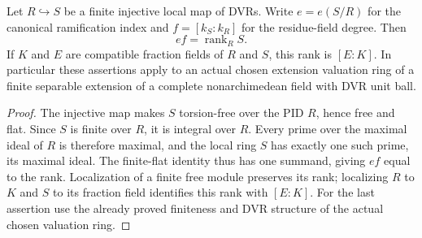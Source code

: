 \begin{lemma}
\label{fw:local-dvr-degree-identity}
\leanok
Let $R\hookrightarrow S$ be a finite injective local map of DVRs.
Write $e=e(S/R)$ for the canonical ramification index and
$f=[k_S:k_R]$ for the residue-field degree. Then
\[
 ef=\operatorname{rank}_R S.
\]
If $K$ and $E$ are compatible fraction fields of $R$ and $S$, this
rank is $[E:K]$. In particular these assertions apply to an actual
chosen extension valuation ring of a finite separable extension of a
complete nonarchimedean field with DVR unit ball.
\end{lemma}
\begin{proof}
The injective map makes $S$ torsion-free over the PID $R$, hence free
and flat. Since $S$ is finite over $R$, it is integral over $R$.
Every prime over the maximal ideal of $R$ is therefore maximal, and
the local ring $S$ has exactly one such prime, its maximal ideal.
The finite-flat identity thus has one summand, giving $ef$ equal
to the rank. Localization of a finite free module preserves its
rank; localizing $R$ to $K$ and $S$ to its fraction field identifies
this rank with $[E:K]$. For the last assertion use the already proved
finiteness and DVR structure of the actual chosen valuation ring.
\end{proof}

